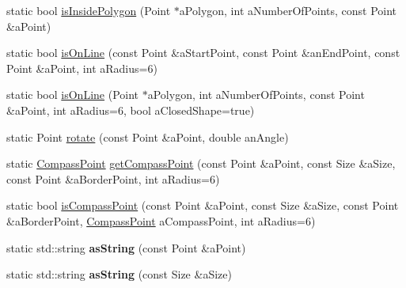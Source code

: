 \begin{DoxyCompactItemize}
\item 
static bool \hyperlink{class_utils_1_1_shape2_d_utils_a297b88bbdc022369dbc06775878a73e5}{is\+Inside\+Polygon} (Point $\ast$a\+Polygon, int a\+Number\+Of\+Points, const Point \&a\+Point)
\item 
static bool \hyperlink{class_utils_1_1_shape2_d_utils_a9fea1c3cfa86f8776a2ffca0f1683c58}{is\+On\+Line} (const Point \&a\+Start\+Point, const Point \&an\+End\+Point, const Point \&a\+Point, int a\+Radius=6)
\item 
static bool \hyperlink{class_utils_1_1_shape2_d_utils_ab86f3e66e5a8f9bbc93e68c8ecc41f38}{is\+On\+Line} (Point $\ast$a\+Polygon, int a\+Number\+Of\+Points, const Point \&a\+Point, int a\+Radius=6, bool a\+Closed\+Shape=true)
\item 
static Point \hyperlink{class_utils_1_1_shape2_d_utils_a80a202c16649fa6da57343df10035f7e}{rotate} (const Point \&a\+Point, double an\+Angle)
\item 
static \hyperlink{class_utils_1_1_shape2_d_utils_a94cfd04764b56fdc1c43325fb8666cf5}{Compass\+Point} \hyperlink{class_utils_1_1_shape2_d_utils_ab1beebca006b82c3f78669b6a13529f8}{get\+Compass\+Point} (const Point \&a\+Point, const Size \&a\+Size, const Point \&a\+Border\+Point, int a\+Radius=6)
\item 
static bool \hyperlink{class_utils_1_1_shape2_d_utils_a19ef7cb8dc087ba4d9eb65c4f11fd7e3}{is\+Compass\+Point} (const Point \&a\+Point, const Size \&a\+Size, const Point \&a\+Border\+Point, \hyperlink{class_utils_1_1_shape2_d_utils_a94cfd04764b56fdc1c43325fb8666cf5}{Compass\+Point} a\+Compass\+Point, int a\+Radius=6)
\item 
static std\+::string {\bfseries as\+String} (const Point \&a\+Point)\hypertarget{class_utils_1_1_shape2_d_utils_a47efad1075c8fabb7af1146f17fadaa2}{}\label{class_utils_1_1_shape2_d_utils_a47efad1075c8fabb7af1146f17fadaa2}

\item 
static std\+::string {\bfseries as\+String} (const Size \&a\+Size)\hypertarget{class_utils_1_1_shape2_d_utils_a801c67d2024d833171fbb99d9ddb5cf1}{}\label{class_utils_1_1_shape2_d_utils_a801c67d2024d833171fbb99d9ddb5cf1}

\end{DoxyCompactItemize}
